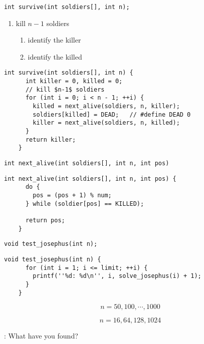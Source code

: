 \begin{frame}[fragile]{\texttt{int survive(int soldiers[], int n);}}

  \begin{enumerate}
    \item kill $n-1$ soldiers 
      \begin{enumerate}
	\item identify the killer
	\item identify the killed
      \end{enumerate}
  \end{enumerate}

  \vspace{0.20cm}
  \pause
  \begin{lstlisting}[style = Cstyle]
    int survive(int soldiers[], int n) {
      int killer = 0, killed = 0;
      // kill $n-1$ soldiers
      for (int i = 0; i < n - 1; ++i) {
        killed = next_alive(soldiers, n, killer);
        soldiers[killed] = DEAD;   // #define DEAD 0
        killer = next_alive(soldiers, n, killed);
      }
      return killer;
    }
  \end{lstlisting}
\end{frame}
\begin{frame}[fragile]{\texttt{int next\_alive(int soldiers[], int n, int pos)}}
  \begin{lstlisting}[style = Cstyle]
    int next_alive(int soldiers[], int n, int pos) {
      do {
        pos = (pos + 1) % num;
      } while (soldier[pos] == KILLED);

      return pos;
    }
  \end{lstlisting}
\end{frame}

\begin{frame}[fragile]{\texttt{void test\_josephus(int n);}}
  \begin{lstlisting}[style = Cstyle]
    void test_josephus(int n) {
      for (int i = 1; i <= limit; ++i) {
        printf(''%d: %d\n'', i, solve_josephus(i) + 1);
      }
    }
  \end{lstlisting}

  \pause
  \[
    n = 50, 100, \cdots, 1000 
  \]

  \[
    n = 16, 64, 128, 1024
  \]

  \vspace{0.50cm}
  \pause
  \centerline{: What have you found?}
\end{frame}

